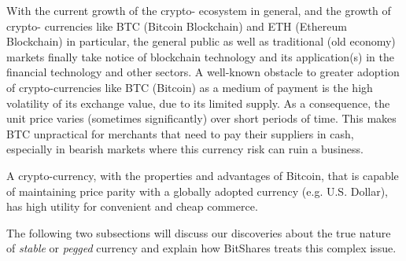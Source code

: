 With the current growth of the crypto- ecosystem in general, and the
growth of crypto- currencies like BTC (Bitcoin Blockchain) and ETH
(Ethereum Blockchain) in particular, the general public as well as
traditional (old economy) markets finally take notice of blockchain
technology and its application(s) in the financial technology and other
sectors. A well-known obstacle to greater adoption of crypto-currencies
like BTC (Bitcoin) as a medium of payment is the high volatility of its
exchange value, due to its limited supply. As a consequence, the unit
price varies (sometimes significantly) over short periods of time. This
makes BTC unpractical for merchants that need to pay their suppliers in
cash, especially in bearish markets where this currency risk can ruin a
business.

A crypto-currency, with the properties and advantages of Bitcoin, that
is capable of maintaining price parity with a globally adopted currency
(e.g. U.S. Dollar), has high utility for convenient and cheap commerce.

The following two subsections will discuss our discoveries about the
true nature of \emph{stable} or \emph{pegged} currency and explain how
BitShares treats this complex issue.
